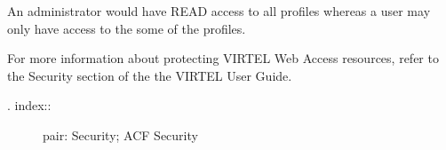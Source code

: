 \documentclass[letterpaper,10pt,english]{sphinxmanual}
\begin{document}
\begin{sphinxVerbatim}[commandchars=\\\{\}]
       
    
\end{sphinxVerbatim}

An administrator would have READ access to all profiles whereas a user may only have access to the some of the profiles.

For more information about protecting VIRTEL Web Access resources, refer to the Security section of the the VIRTEL User Guide.
\begin{description}
\item[{. index::}] \leavevmode
pair: Security; ACF Security

\end{description}
\end{document}
